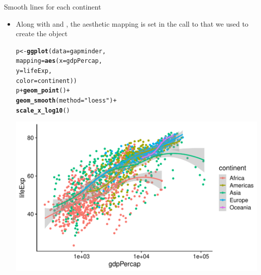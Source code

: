 \documentclass[10pt,handout]{beamer}\usepackage[]{graphicx}\usepackage[]{color}
\makeatletter
\def\maxwidth{ %
  \ifdim\Gin@nat@width>\linewidth
    \linewidth
  \else
    \Gin@nat@width
  \fi
}
\newcommand{\hlstr}[1]{\textcolor[rgb]{0.192,0.494,0.8}{#1}}%
\newcommand{\hlopt}[1]{\textcolor[rgb]{0,0,0}{#1}}%
\newcommand{\hlstd}[1]{\textcolor[rgb]{0.345,0.345,0.345}{#1}}%
\newcommand{\hlkwb}[1]{\textcolor[rgb]{0.69,0.353,0.396}{#1}}%
\newcommand{\hlkwc}[1]{\textcolor[rgb]{0.333,0.667,0.333}{#1}}%
\newcommand{\hlkwd}[1]{\textcolor[rgb]{0.737,0.353,0.396}{\textbf{#1}}}%
\newenvironment{kframe}{%
 \def\at@end@of@kframe{}%
 \ifinner\ifhmode%
  \def\at@end@of@kframe{\end{minipage}}%
  \begin{minipage}{\columnwidth}%
 \fi\fi%
 \def\FrameCommand##1{\hskip\@totalleftmargin \hskip-\fboxsep
 \colorbox{shadecolor}{##1}\hskip-\fboxsep
     \hskip-\linewidth \hskip-\@totalleftmargin \hskip\columnwidth}%
 \MakeFramed {\advance\hsize-\width
   \@totalleftmargin\z@ \linewidth\hsize
   \@setminipage}}%
 {\par\unskip\endMakeFramed%
 \at@end@of@kframe}
\newenvironment{knitrout}{}{} %
\makeatother
\begin{document}
\begin{frame}[fragile]{Smooth lines for each continent}
	\begin{itemize}
		\item Along with  and , the  aesthetic mapping is set in the call to  that we used to create the  object
\begin{knitrout}\tiny
{}\color{fgcolor}\begin{kframe}
\begin{alltt}
\hlstd{p} \hlkwb{<-} \hlkwd{ggplot}\hlstd{(}\hlkwc{data} \hlstd{= gapminder,}
            \hlkwc{mapping} \hlstd{=} \hlkwd{aes}\hlstd{(}\hlkwc{x} \hlstd{= gdpPercap,}
            \hlkwc{y} \hlstd{= lifeExp,}
            \hlkwc{color} \hlstd{= continent))}
\hlstd{p} \hlopt{+} \hlkwd{geom_point}\hlstd{()} \hlopt{+}
        \hlkwd{geom_smooth}\hlstd{(}\hlkwc{method} \hlstd{=} \hlstr{"loess"}\hlstd{)} \hlopt{+}
        \hlkwd{scale_x_log10}\hlstd{()}
\end{alltt}
\end{kframe}

{\centering \includegraphics[width=\maxwidth]{figure/unnamed-chunk-16-1} 

}


\end{knitrout}
	\end{itemize}
	
\end{frame}
\end{document}
